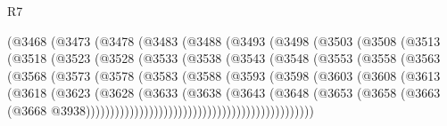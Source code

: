 \begin{lexlean}{R7}
\begin{coremodule}
                (@3468
                  (@3473
                    (@3478
                      (@3483
                        (@3488
                          (@3493
                            (@3498
                              (@3503
                                (@3508
                                  (@3513
                                    (@3518
                                      (@3523
                                        (@3528
                                          (@3533
                                            (@3538
                                              (@3543
                                                (@3548
                                                  (@3553
                                                    (@3558
                                                      (@3563
                                                        (@3568
                                                          (@3573
                                                            (@3578
                                                              (@3583
                                                                (@3588
                                                                  (@3593
                                                                    (@3598
                                                                      (@3603
                                                                        (@3608
                                                                          (@3613
                                                                            (@3618
                                                                              (@3623
                                                                                (@3628
                                                                                  (@3633
                                                                                    (@3638
                                                                                      (@3643
                                                                                        (@3648
                                                                                          (@3653
                                                                                            (@3658
                                                                                              (@3663
                                                                                                (@3668
                                                                                                  @3938)))))))))))))))))))))))))))))))))))))))))))))))

\end{coremodule}
\end{lexlean}
